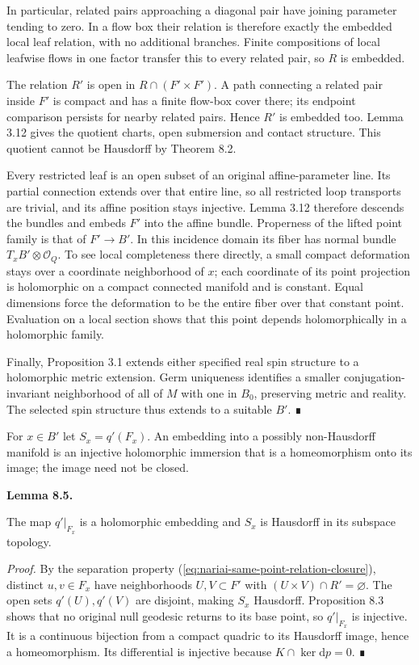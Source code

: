 \documentclass[
  english,
  11pt,
  reqno]{amsart}
\makeatletter
\newcommand{\pandocstatementheading}[1]{%
  \par\addpenalty{\@beginparpenalty}%
  \addvspace{.5\baselineskip plus .2\baselineskip minus .2\baselineskip}%
  {\normalfont\bfseries #1\par}%
  \nobreak\@afterindenttrue\@afterheading
}
\makeatother
\begin{document}
In particular, related pairs approaching a diagonal pair have joining
parameter tending to zero. In a flow box their relation is therefore
exactly the embedded local leaf relation, with no additional branches.
Finite compositions of local leafwise flows in one factor transfer this
to every related pair, so \(R\) is embedded.

The relation \(R'\) is open in \(R\cap(F'\times F')\). A path connecting
a related pair inside \(F'\) is compact and has a finite flow-box cover
there; its endpoint comparison persists for nearby related pairs. Hence
\(R'\) is embedded too. Lemma 3.12 gives the quotient charts, open
submersion and contact structure. This quotient cannot be Hausdorff by
Theorem 8.2.

Every restricted leaf is an open subset of an original affine-parameter
line. Its partial connection extends over that entire line, so all
restricted loop transports are trivial, and its affine position stays
injective. Lemma 3.12 therefore descends the bundles and embeds \(F'\)
into the affine bundle. Properness of the lifted point family is that of
\(F'\to B'\). In this incidence domain its fiber has normal bundle
\(T_xB'\otimes\mathcal O_Q\). To see local completeness there directly,
a small compact deformation stays over a coordinate neighborhood of
\(x\); each coordinate of its point projection is holomorphic on a
compact connected manifold and is constant. Equal dimensions force the
deformation to be the entire fiber over that constant point. Evaluation
on a local section shows that this point depends holomorphically in a
holomorphic family.

Finally, Proposition 3.1 extends either specified real spin structure to
a holomorphic metric extension. Germ uniqueness identifies a smaller
conjugation-invariant neighborhood of all of \(M\) with one in \(B_0\),
preserving metric and reality. The selected spin structure thus extends
to a suitable \(B'\). ∎

For \(x\in B'\) let \(S_x=q'(F_x)\). An embedding into a possibly
non-Hausdorff manifold is an injective holomorphic immersion that is a
homeomorphism onto its image; the image need not be closed.

\pandocstatementheading{\protect{}\label{lem:nariai-individual-sky-embedding}Lemma 8.5.}

The map \(q'|_{F_x}\) is a holomorphic embedding and \(S_x\) is
Hausdorff in its subspace topology.

\emph{Proof.} By the separation property
(\ref{eq:nariai-same-point-relation-closure}), distinct \(u,v\in F_x\)
have neighborhoods \(U,V\subset F'\) with
\((U\times V)\cap R'=\varnothing\). The open sets \(q'(U),q'(V)\) are
disjoint, making \(S_x\) Hausdorff. Proposition 8.3 shows that no
original null geodesic returns to its base point, so \(q'|_{F_x}\) is
injective. It is a continuous bijection from a compact quadric to its
Hausdorff image, hence a homeomorphism. Its differential is injective
because \(K\cap\ker\mathrm dp=0\). ∎
\end{document}
